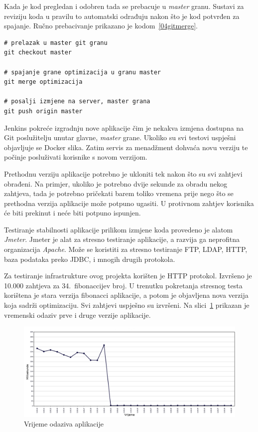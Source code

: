 Kada je kod pregledan i odobren tada se prebacuje u \textit{master} granu. Sustavi za reviziju koda
u pravilu to automatski odrađuju nakon što je kod potvrđen za spajanje. Ručno prebacivanje prikazano
je kodom~\ref{04gitmerge}.

\begin{lstlisting}[float=h]
# prelazak u master git granu
git checkout master

# spajanje grane optimizacija u granu master
git merge optimizacija

# posalji izmjene na server, master grana
git push origin master
\end{lstlisting}

Jenkins pokreće izgradnju nove aplikacije čim je nekakva izmjena dostupna na Git poslužitelju unutar
glavne, \textit{master} grane. Ukoliko su svi testovi uspješni objavljuje se Docker slika. Zatim
servis za menadžment dohvaća novu verziju te počinje posluživati korisnike s novom verzijom.

Prethodnu verziju aplikacije potrebno je ukloniti tek nakon što su svi zahtjevi obrađeni. Na
primjer, ukoliko je potrebno dvije sekunde za obradu nekog zahtjeva, tada je potrebno pričekati
barem toliko vremena prije nego što se prethodna verzija aplikacije može potpuno ugasiti.  U
protivnom zahtjev korisnika će biti prekinut i neće biti potpuno ispunjen.

Testiranje stabilnosti aplikacije prilikom izmjene koda provedeno je alatom \textit{Jmeter}. Jmeter
je alat za stresno testiranje aplikacije, a razvija ga neprofitna organizacija \textit{Apache}. Može
se koristiti za stresno testiranje FTP, LDAP, HTTP, baza podataka preko JDBC, i mnogih drugih
protokola.

Za testiranje infrastrukture ovog projekta korišten je HTTP protokol. Izvršeno je 10.000 zahtjeva
za 34.~fibonaccijev broj. U trenutku pokretanja stresnog testa korištena je stara verzija fibonacci
aplikacije, a potom je objavljena nova verzija koja sadrži optimizaciju. Svi zahtjevi uspješno su
izvršeni. Na slici~\ref{fig:04stresstest} prikazan je vremenski odaziv prve i druge verzije
aplikacije.

\begin{figure}[h]
    \centering
    \includegraphics[width=\textwidth]{img/04/response_time.png}
    \caption{Vrijeme odaziva aplikacije}%
    \label{fig:04stresstest}
\end{figure}

